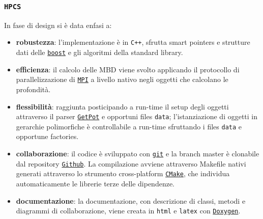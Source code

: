 \documentclass[9pt]{beamer}
\begin{document}
\begin{frame}
\frametitle{\texttt{HPCS}}
\begin{center}
\end{center}


In fase di design si \`e data enfasi a:
\begin{itemize}
\item \textbf{robustezza}: l'implementazione \`e in \texttt{C++}, sfrutta smart pointers e strutture dati delle \href{http://www.boost.org}{\texttt{boost}} e gli algoritmi della standard library.
\pause
\item \textbf{efficienza}: il calcolo delle MBD viene svolto applicando il protocollo di parallelizzazione di \href{http://www.open-mpi.org}{\texttt{MPI}} a livello nativo negli oggetti che calcolano le profondit\`a.
\pause
\item \textbf{flessibilit\`a}: raggiunta posticipando a run-time il setup degli oggetti attraverso il parser \href{http://getpot.sourceforge.net}{\texttt{GetPot}} e opportuni files \texttt{data};
					     l'istanziazione di oggetti in gerarchie polimorfiche \`e controllabile a run-time sfruttando i files \texttt{data} e opportune factories.
\pause
\item \textbf{collaborazione}: il codice \`e sviluppato con \href{http://git-scm.com}{\texttt{git}} e la branch master \`e clonabile dal repository \href{https://github.com/larvatus/HPCS}{ \texttt{Github}}.
						  La compilazione avviene attraverso Makefile nativi generati attraverso lo strumento cross-platform \href{http://www.cmake.org}{\texttt{CMake}}, che individua automaticamente le
						  librerie terze delle dipendenze.
\pause
\item \textbf{documentazione}: la documentazione, con descrizione di classi, metodi e diagrammi di collaborazione, viene creata in \texttt{html} e \texttt{latex} con  \href{http://www.doxygen.org}{\texttt{Doxygen}}.
\end{itemize}

\end{frame}

\end{document}
